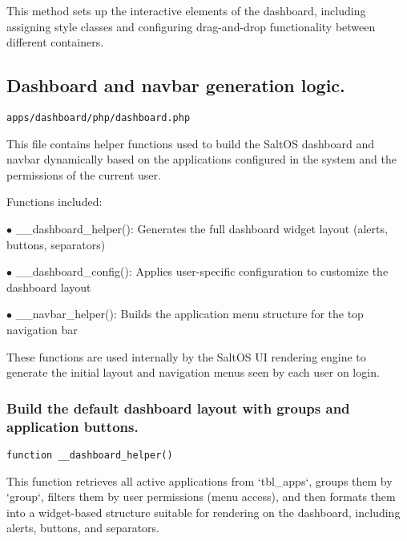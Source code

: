 \documentclass[a4paper]{article}
\begin{document}
This method sets up the interactive elements of the dashboard, including assigning style classes
and configuring drag-and-drop functionality between different containers.

\hypertarget{toc58}{}
\subsection{Dashboard and navbar generation logic.}

\begin{lstlisting}
apps/dashboard/php/dashboard.php
\end{lstlisting}

This file contains helper functions used to build the SaltOS dashboard and navbar
dynamically based on the applications configured in the system and the permissions
of the current user.

Functions included:

\begin{compactitem}
\item[\color{myblue}$\bullet$] \_\_dashboard\_helper(): Generates the full dashboard widget layout (alerts, buttons, separators)
\item[\color{myblue}$\bullet$] \_\_dashboard\_config(): Applies user-specific configuration to customize the dashboard layout
\item[\color{myblue}$\bullet$] \_\_navbar\_helper(): Builds the application menu structure for the top navigation bar
\end{compactitem}

These functions are used internally by the SaltOS UI rendering engine to generate
the initial layout and navigation menus seen by each user on login.

\hypertarget{toc59}{}
\subsubsection{Build the default dashboard layout with groups and application buttons.}

\begin{lstlisting}
function __dashboard_helper()
\end{lstlisting}

This function retrieves all active applications from `tbl\_apps`,
groups them by `group`, filters them by user permissions (menu access),
and then formats them into a widget-based structure suitable for rendering
on the dashboard, including alerts, buttons, and separators.
\end{document}
